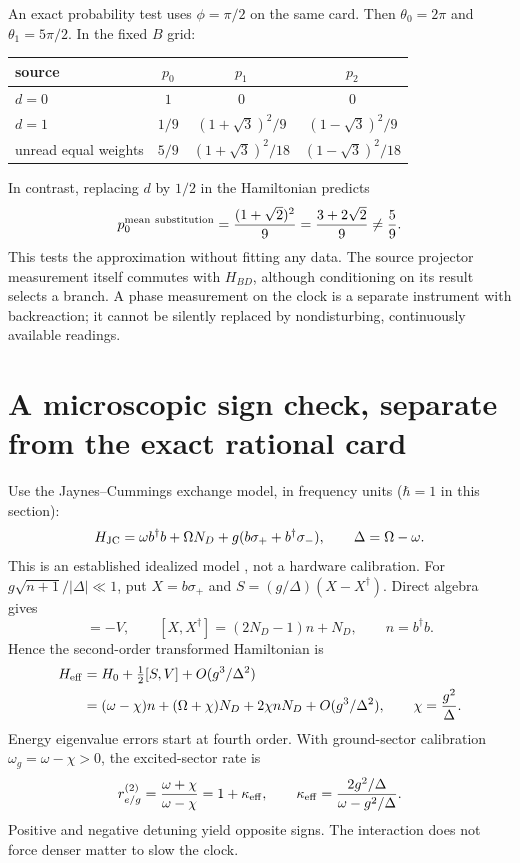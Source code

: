 \documentclass[11pt,a4paper]{article}
\begin{document}
An exact probability test uses $\phi=\pi/2$ on the same card.
Then $\theta_0=2\pi$ and $\theta_1=5\pi/2$. In the fixed $B$ grid:
\begin{center}
\begin{tabular}{lccc}
\toprule
source & $p_0$ & $p_1$ & $p_2$\\
\midrule
$d=0$ & $1$ & $0$ & $0$\\
$d=1$ & $1/9$ & $(1+\sqrt3)^2/9$ & $(1-\sqrt3)^2/9$\\
unread equal weights & $5/9$ & $(1+\sqrt3)^2/18$ & $(1-\sqrt3)^2/18$\\
\bottomrule
\end{tabular}
\end{center}
In contrast, replacing $d$ by $1/2$ in the Hamiltonian predicts
\begin{equation}
 p_0^{\rm mean\ substitution}
 =\frac{(1+\sqrt2)^2}{9}
 =\frac{3+2\sqrt2}{9}\neq\frac59 .
\end{equation}
This tests the approximation without fitting any data. The source
projector measurement itself commutes with $H_{BD}$, although
conditioning on its result selects a branch. A phase measurement on
the clock is a separate instrument with backreaction; it cannot be
silently replaced by nondisturbing, continuously available readings.

\newpage
\section{A microscopic sign check, separate from the exact rational card}
Use the Jaynes--Cummings exchange model, in frequency units
($\hbar=1$ in this section):
\begin{equation}
 H_{\rm JC}=\omega b^\dagger b+\Omega N_D
       +g(b\sigma_++b^\dagger\sigma_-),\qquad \Delta=\Omega-\omega .
\end{equation}
This is an established idealized model \cite{blais}, not a hardware
calibration. For $g\sqrt{n+1}/|\Delta|\ll1$, put
$X=b\sigma_+$ and $S=(g/\Delta)(X-X^\dagger)$. Direct algebra gives
\begin{equation}
 [S,H_0]=-V,\qquad
 [X,X^\dagger]=(2N_D-1)n+N_D,\qquad n=b^\dagger b .
\end{equation}
Hence the second-order transformed Hamiltonian is
\begin{align}
 H_{\rm eff}
 &=H_0+\tfrac12[S,V]+O(g^3/\Delta^2)\nonumber\\
 &=(\omega-\chi)n+(\Omega+\chi)N_D+2\chi nN_D
     +O(g^3/\Delta^2),\qquad \chi=\frac{g^2}{\Delta}.
\end{align}
Energy eigenvalue errors start at fourth order. With ground-sector
calibration $\omega_g=\omega-\chi>0$, the excited-sector rate is
\begin{equation}
 r_{e/g}^{(2)}=\frac{\omega+\chi}{\omega-\chi}
 =1+\kappa_{\rm eff},\qquad
 \kappa_{\rm eff}=\frac{2g^2/\Delta}{\omega-g^2/\Delta}.
\end{equation}
Positive and negative detuning yield opposite signs. The interaction
does not force denser matter to slow the clock.
\end{document}
